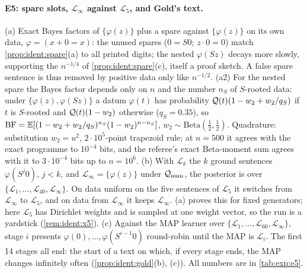 \paragraph{E5: spare slots, $\mathcal L_\infty$ against $\mathcal L_5$, and Gold's text.}
(a) Exact Bayes factors of $\{\varphi(z)\}$ plus a spare against $\{\varphi(z)\}$ on its own \Lzero{} data, $\varphi=(x+0=x)$: the unused spares ($0=S0$; $z\cdot0=0$) match \cref{prop:ident:spare}(a) to all printed digits; the nested $\varphi(Sz)$ decays more slowly, supporting the $n^{-1/4}$ of \cref{prop:ident:spare}(c), itself a proof sketch. A false spare sentence is thus removed by positive data only like $n^{-1/2}$. (a2) For the nested spare the Bayes factor depends only on $n$ and the number $n_S$ of $S$-rooted data: under $\{\varphi(z),\varphi(Sz)\}$ a datum $\varphi(t)$ has probability $\mathcal{Q}(t)(1-w_2+w_2/q_S)$ if $t$ is $S$-rooted and $\mathcal{Q}(t)(1-w_2)$ otherwise ($q_S=0.35$), so $\mathrm{BF}=\mathbb{E}[(1-w_2+w_2/q_S)^{n_S}(1-w_2)^{n-n_S}]$, $w_2\sim\mathrm{Beta}(\tfrac12,\tfrac12)$. Quadrature: substitution $w_2=u^2$, $2\cdot10^5$-point trapezoid rule; at $n=500$ it agrees with the exact programme to $10^{-4}$ bits, and the referee's exact Beta-moment sum agrees with it to $3\cdot10^{-4}$ bits up to $n=10^6$.
(b) With $\mathcal L_k$ the $k$ ground sentences $\varphi(S^j0)$, $j<k$, and $\mathcal L_\infty=\{\varphi(z)\}$ under $\mathcal{Q}_{\mathrm{num}}$, the posterior is over $\{\mathcal L_1,\dots,\mathcal L_{40},\mathcal L_\infty\}$. On data uniform on the five sentences of $\mathcal L_5$ it switches from $\mathcal L_\infty$ to $\mathcal L_5$, and on data from $\mathcal L_\infty$ it keeps $\mathcal L_\infty$. (a) proves this for fixed generators; here $\mathcal L_5$ has Dirichlet weights and is sampled at one weight vector, so the run is a yardstick (\cref{rem:ident:x5}).
(c) Against the MAP learner over $\{\mathcal L_1,\dots,\mathcal L_{60},\mathcal L_\infty\}$, stage $i$ presents $\varphi(0),\dots,\varphi(S^{i-1}0)$ round-robin until the MAP is $\mathcal L_i$. The first 14 stages all end: the start of a text on which, if every stage ends, the MAP changes infinitely often (\cref{prop:ident:gold}(b), (c)). All numbers are in \cref{tab:exp:e5}.

